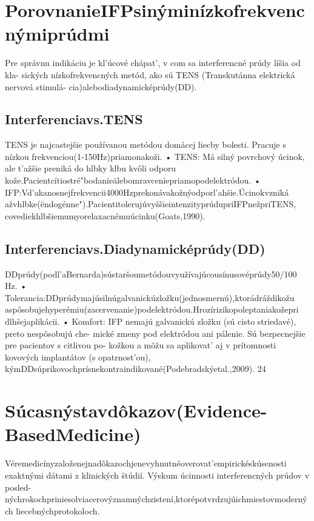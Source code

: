 \section{PorovnanieIFPsinýminízkofrekvencnýmiprúdmi}

Pre správnu indikáciu je kl’úcové chápat’, v com sa interferencné prúdy líšia od kla- sických nízkofrekvencných metód, ako sú TENS (Transkutánna elektrická nervová stimulá- cia)alebodiadynamicképrúdy(DD).


\subsection{Interferenciavs.TENS}

TENS je najcastejšie používanou metódou domácej liecby bolesti. Pracuje s nízkou frekvenciou(1-150Hz)priamonakoži. • TENS: Má silný povrchový úcinok, ale t’ažšie preniká do hlbky klbu kvôli odporu kože.Pacientcítiostré"bodanieälebomravceniepriamopodelektródou. • IFP:Vd’akanosnejfrekvencii4000Hzprekonávakožnýodporl’ahšie.Úcinokvzniká ažvhlbke(ëndogénne").PacientitolerujúvyššieintenzityprúdupriIFPnežpriTENS, covediekhlbšiemumyorelaxacnémuúcinku(Goats,1990).


\subsection{Interferenciavs.Diadynamicképrúdy(DD)}

DDprúdy(podl’aBernarda)sústaršoumetódouvyužívajúcousínusovéprúdy50/100 Hz. • Tolerancia:DDprúdymajúsilnúgalvanickúzložku(jednosmernú),ktorádráždikožu aspôsobujehyperémiu(zacervenanie)podelektródou.Hrozírizikopoleptaniakožepri dlhšejaplikácii. • Komfort: IFP nemajú galvanickú zložku (sú cisto striedavé), preto nespôsobujú che- mické zmeny pod elektródou ani pálenie. Sú bezpecnejšie pre pacientov s citlivou po- kožkou a môžu sa aplikovat’ aj v prítomnosti kovových implantátov (s opatrnost’ou), kýmDDsúprikovochprísnekontraindikované(Podebradskýetal.,2009). 24


\section{Súcasnýstavdôkazov(Evidence-BasedMedicine)}

Véremedicínyzaloženejnadôkazochjenevyhnutnéoverovat’empirickéskúsenosti exaktnými dátami z klinických štúdií. Výskum úcinnosti interferencných prúdov v posled- nýchrokochpriniesolviacerovýznamnýchzistení,ktorépotvrdzujúichmiestovmoderných liecebnýchprotokoloch.



